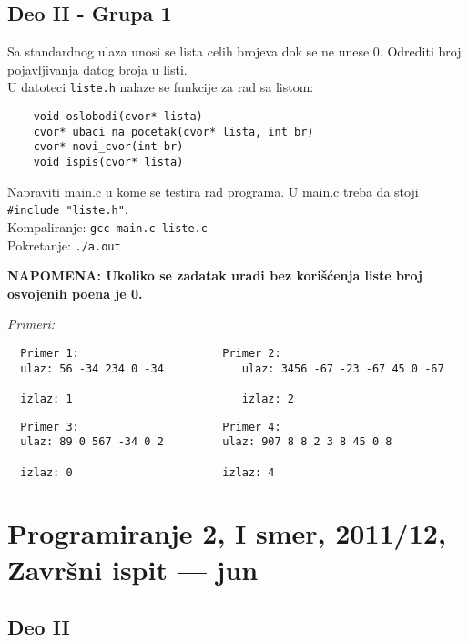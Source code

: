 \bigskip

\subsection{Deo II - Grupa 1}

Sa standardnog ulaza unosi se lista celih brojeva dok se ne unese 0.
  Odrediti broj pojavljivanja datog broja u listi.\\

  \noindent U datoteci \verb|liste.h| nalaze se funkcije za rad sa listom:
    \begin{verbatim}
    void oslobodi(cvor* lista)
    cvor* ubaci_na_pocetak(cvor* lista, int br)
    cvor* novi_cvor(int br)
    void ispis(cvor* lista)
    \end{verbatim}

    \noindent Napraviti main.c u kome se testira rad programa. U main.c treba da stoji \verb|#include "liste.h"|. \\
    Kompaliranje:   \verb|gcc main.c liste.c|\\
    Pokretanje: \verb|./a.out|

  \textbf{NAPOMENA: Ukoliko se zadatak uradi bez kori\v s\' cenja liste broj osvojenih poena je 0.}

\emph{Primeri:}

\begin{verbatim}
  Primer 1:                      Primer 2:
  ulaz: 56 -34 234 0 -34            ulaz: 3456 -67 -23 -67 45 0 -67

  izlaz: 1                          izlaz: 2

\end{verbatim}

\begin{verbatim}
  Primer 3:                      Primer 4:
  ulaz: 89 0 567 -34 0 2         ulaz: 907 8 8 2 3 8 45 0 8

  izlaz: 0                       izlaz: 4
\end{verbatim}


\section{Programiranje 2, I smer, 2011/12, Zavr\v{s}ni ispit --- jun}

\subsection{Deo II}

